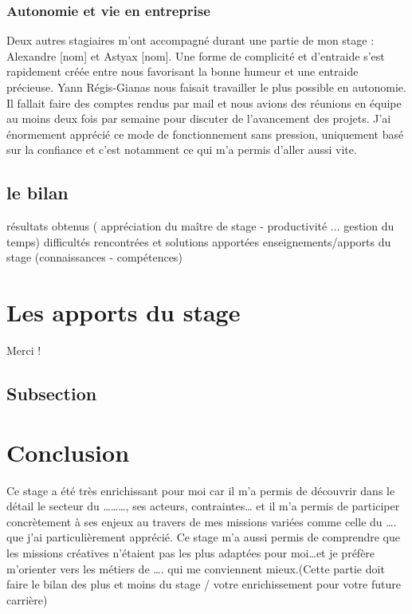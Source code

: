 \documentclass{article}
\begin{document}
\subsubsection{Autonomie et vie en entreprise}

Deux autres stagiaires m'ont accompagné durant une partie de mon stage : Alexandre [nom] et Astyax [nom].
\newline
Une forme de complicité et d'entraide s'est rapidement créée entre nous favorisant la bonne humeur et une entraide précieuse.
\newline
Yann Régis-Gianas nous faisait travailler le plus possible en autonomie. Il fallait faire des comptes rendus par mail et nous avions des réunions en équipe au moins deux fois par semaine pour discuter de l'avancement des projets.
\newline
J'ai énormement apprécié ce mode de fonctionnement sans pression, uniquement basé sur la confiance et c'est notamment ce qui m'a permis d'aller aussi vite.

\subsection{le bilan}
résultats obtenus ( appréciation du maître de stage - productivité ... gestion du temps)
difficultés rencontrées et solutions apportées
enseignements/apports du stage (connaissances - compétences)

\newpage

\section{Les apports du stage}
Merci !

\subsection{Subsection}

\newpage

\section{Conclusion}

Ce stage a été très enrichissant pour moi car il m’a permis de découvrir dans le détail le secteur du ………, ses acteurs, contraintes… et il m’a permis de participer concrètement à ses enjeux au travers de mes missions variées comme celle du …. que j’ai particulièrement apprécié. Ce stage m’a aussi permis de comprendre que les missions créatives n’étaient pas les plus adaptées pour moi…et je préfère m’orienter vers les métiers de …. qui me conviennent mieux.(Cette partie doit faire le bilan des plus et moins du stage / votre enrichissement pour votre future carrière)
\end{document}

